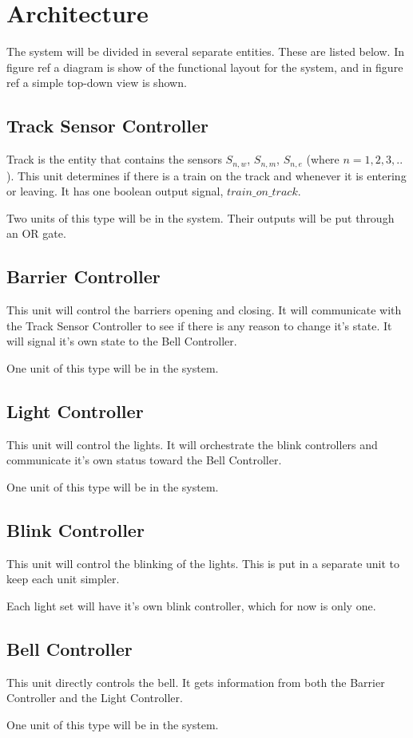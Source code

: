 \documentclass[final]{report}
\begin{document}
\chapter{Architecture}
The system will be divided in several separate entities.
These are listed below. In figure ref{} a diagram is show of the functional layout for the system, and in figure ref{} a simple top-down view is shown. %

\section{Track Sensor Controller}
Track is the entity that contains the sensors $S_{n,w}$, $S_{n,m}$, $S_{n,e}$ (where $n = 1,2,3,..$).
This unit determines if there is a train on the track and whenever it is entering or leaving.
It has one boolean output signal, $train\_on\_track$.

Two units of this type will be in the system. Their outputs will be put through an OR gate.

\section{Barrier Controller}
This unit will control the barriers opening and closing.
It will communicate with the Track Sensor Controller to see if there is any reason to change it's state.
It will signal it's own state to the Bell Controller.

One unit of this type will be in the system.

\section{Light Controller}
This unit will control the lights.
It will orchestrate the blink controllers and communicate it's own status toward the Bell Controller.

One unit of this type will be in the system.

\section{Blink Controller}
This unit will control the blinking of the lights.
This is put in a separate unit to keep each unit simpler.

Each light set will have it's own blink controller, which for now is only one.

\section{Bell Controller}
This unit directly controls the bell.
It gets information from both the Barrier Controller and the Light Controller.

One unit of this type will be in the system.
\end{document}
